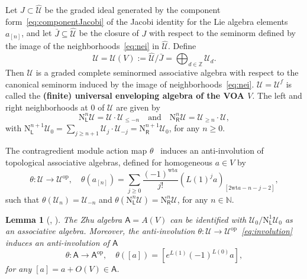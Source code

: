 \documentclass[12pt,a4paper,reqno]{amsart}
\numberwithin{equation}{section}
\newtheorem{lemma}[theorem]{Lemma}
\theoremstyle{definition}
\newcommand{\N}{\mathbb{N}}
\newcommand{\Z}{\mathbb{Z}}
\newcommand{\U}{\mathcal{U}}
\def\L{\mathsf{L}}
\def\R{\mathsf{R}}
\def\wt{\mathrm{wt}}
\def\ra{\rightarrow}
\def\scrU{\mathscr{U}}
\def\ssq{\subseteq}
\def\rN{\mathrm{N}}
\def\A{\mathsf{A}}
\begin{document}
	Let $J\subset \widehat{\U}$ be the graded ideal generated by the component form~\eqref{eq:componentJacobi} of the Jacobi identity for the Lie algebra elements $a_{[n]}$, and let $\bar{J}\ssq \widehat{\U}$ be the closure of $J$ with respect to the seminorm defined by the image of the neighborhoods~\eqref{eq:nei} in $\widehat{\U}$. Define
	\[\scrU=\scrU(V):=\widehat{\U}/\bar{J}=\bigoplus_{d\in \Z} \scrU_d.\]
	Then $\scrU$ is a graded complete seminormed associative algebra with respect to the canonical seminorm induced by the image of neighborhoods~\eqref{eq:nei}. $\scrU=\scrU^f$ is called the \textbf{(finite) universal enveloping algebra of the VOA $V$}. The left and right neighborhoods at $0$ of $\scrU$ are given by
	\begin{equation}\label{eq:nebors}
		\rN^n_\L \scrU=\scrU\cdot \scrU_{\leq -n}\quad \text{and}\quad  	\rN^n_\R \scrU=\scrU_{\geq n}\cdot \scrU,
	\end{equation}
	with $	\rN^{n+1}_\L \scrU_0=\sum_{j \geq n+1} \scrU_j\cdot \scrU_{-j}=	\rN^{n+1}_\R \scrU_0$, for any $n\geq 0$.

	The contragredient module action map $\theta$~\cite{FHL93} induces an anti-involution of topological associative algebras, defined for homogeneous $a\in V$ by
	\begin{equation}\label{eq:involution}
		\theta: \scrU\ra \scrU^{\mathrm{op}},\quad \theta(a_{[n]})=\sum_{j\geq 0}\frac{(-1)^{\wt a}}{j!} (L(1)^ja)_{[2\wt a-n-j-2]},
	\end{equation}
	such that $\theta(\scrU_n)=\scrU_{-n}$ and $\theta(\rN^n_\L \scrU)=\rN^n_\R \scrU$, for any $n\in \N$.
	
	
	\begin{lemma}[{\cite[Section 1.4]{FZ92}, \cite[Lemma 2.5.2]{DGK2}}]\label{lm5.1}
		The Zhu algebra $\A=A(V)$ can be identified with $\scrU_0/\rN^1_\L\scrU_0$ as an associative algebra. Moreover, the anti-involution $\theta:\scrU\ra \scrU^{\mathrm{op}}$~\eqref{eq:involution} induces an anti-involution of $\A$~\cite[(2.1.9)]{zhu1996modular}
        \[
        \theta: \A\ra \A^{\mathrm{op}},\quad \theta([a])=[e^{L(1)}(-1)^{L(0)}a],
        \]
        for any $[a]=a+O(V)\in \A$.
	\end{lemma}
	
\end{document}
